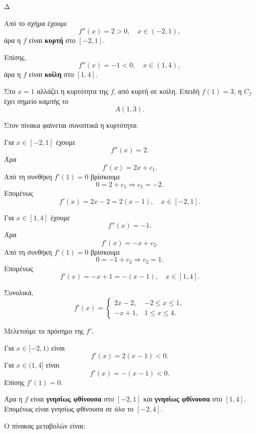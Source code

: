 \begin{thema}{Δ}
\begin{erwthma}
\item Από το σχήμα έχουμε
\[
f''(x)=2>0,\quad x\in(-2,1),
\]
άρα η $f$ είναι \textbf{κυρτή} στο $[-2,1]$.

Επίσης,
\[
f''(x)=-1<0,\quad x\in(1,4),
\]
άρα η $f$ είναι \textbf{κοίλη} στο $[1,4]$.

Στο $x=1$ αλλάζει η κυρτότητα της $f$, από κυρτή σε κοίλη. Επειδή
$f(1)=3$, η $C_f$ έχει σημείο καμπής το
\[
{A(1,3)}.
\]

Στον πίνακα φαίνεται συνοπτικά η κυρτότητα:
\begin{center}
\end{center}

\item Για $x\in[-2,1]$ έχουμε
\[
f''(x)=2.
\]
Άρα
\[
f'(x)=2x+c_1.
\]
Από τη συνθήκη $f'(1)=0$ βρίσκουμε
\[
0=2+c_1\Rightarrow c_1=-2.
\]
Επομένως
\[
f'(x)=2x-2=2(x-1),\quad x\in[-2,1].
\]

Για $x\in[1,4]$ έχουμε
\[
f''(x)=-1.
\]
Άρα
\[
f'(x)=-x+c_2.
\]
Από τη συνθήκη $f'(1)=0$ βρίσκουμε
\[
0=-1+c_2\Rightarrow c_2=1.
\]
Επομένως
\[
f'(x)=-x+1=-(x-1),\quad x\in[1,4].
\]

Συνολικά,
\[
{
f'(x)=
\begin{cases}
2x-2, & -2\leq x\leq 1,\\
-x+1, & 1\leq x\leq 4.
\end{cases}}
\]

\item Μελετούμε το πρόσημο της $f'$.

Για $x\in[-2,1)$ είναι
\[
f'(x)=2(x-1)<0.
\]
Για $x\in(1,4]$ είναι
\[
f'(x)=-(x-1)<0.
\]
Επίσης $f'(1)=0$.

Άρα η $f$ είναι \textbf{γνησίως φθίνουσα} στο $[-2,1]$ και
\textbf{γνησίως φθίνουσα} στο $[1,4]$. Επομένως είναι γνησίως
φθίνουσα σε όλο το $[-2,4]$.

Ο πίνακας μεταβολών είναι:
\begin{center}
\end{center}


\end{erwthma}
\end{thema}

